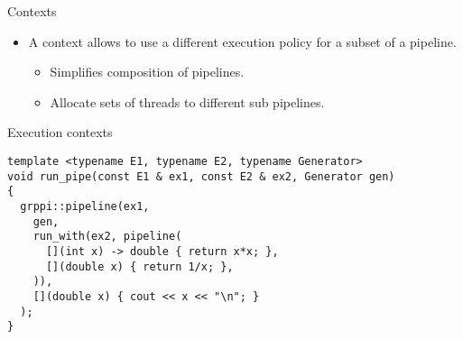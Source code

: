 \begin{frame}[t,fragile]{Contexts}
\begin{itemize}
  \item A context allows to use a different execution policy for
        a subset of a pipeline.
    \begin{itemize}
      \item Simplifies composition of pipelines.
      \item Allocate sets of threads to different sub pipelines.
    \end{itemize}
\end{itemize}
\begin{block}{Execution contexts}
\begin{lstlisting}
template <typename E1, typename E2, typename Generator>
void run_pipe(const E1 & ex1, const E2 & ex2, Generator gen)
{
  grppi::pipeline(ex1,
    gen,
    run_with(ex2, pipeline(
      [](int x) -> double { return x*x; },
      [](double x) { return 1/x; },
    )),
    [](double x) { cout << x << "\n"; }
  );
}
\end{lstlisting}
\end{block}
\end{frame}

